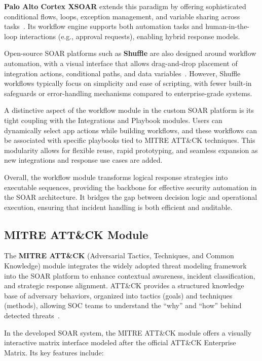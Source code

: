 \textbf{Palo Alto Cortex XSOAR} extends this paradigm by offering sophisticated conditional flows, loops, exception management, and variable sharing across tasks~\cite{paloalto}. Its workflow engine supports both automation tasks and human-in-the-loop interactions (e.g., approval requests), enabling hybrid response models.

Open-source SOAR platforms such as \textbf{Shuffle} are also designed around workflow automation, with a visual interface that allows drag-and-drop placement of integration actions, conditional paths, and data variables~\cite{techtarget}. However, Shuffle workflows typically focus on simplicity and ease of scripting, with fewer built-in safeguards or error-handling mechanisms compared to enterprise-grade systems.

A distinctive aspect of the workflow module in the custom SOAR platform is its tight coupling with the Integrations and Playbook modules. Users can dynamically select app actions while building workflows, and these workflows can be associated with specific playbooks tied to MITRE ATT\&CK techniques. This modularity allows for flexible reuse, rapid prototyping, and seamless expansion as new integrations and response use cases are added.

Overall, the workflow module transforms logical response strategies into executable sequences, providing the backbone for effective security automation in the SOAR architecture. It bridges the gap between decision logic and operational execution, ensuring that incident handling is both efficient and auditable.

\subsection{MITRE ATT\&CK Module}

The \textbf{MITRE ATT\&CK} (Adversarial Tactics, Techniques, and Common Knowledge) module integrates the widely adopted threat modeling framework into the SOAR platform to enhance contextual awareness, incident classification, and strategic response alignment. ATT\&CK provides a structured knowledge base of adversary behaviors, organized into tactics (goals) and techniques (methods), allowing SOC teams to understand the “why” and “how” behind detected threats~\cite{mitre}.

In the developed SOAR system, the MITRE ATT\&CK module offers a visually interactive matrix interface modeled after the official ATT\&CK Enterprise Matrix. Its key features include:

